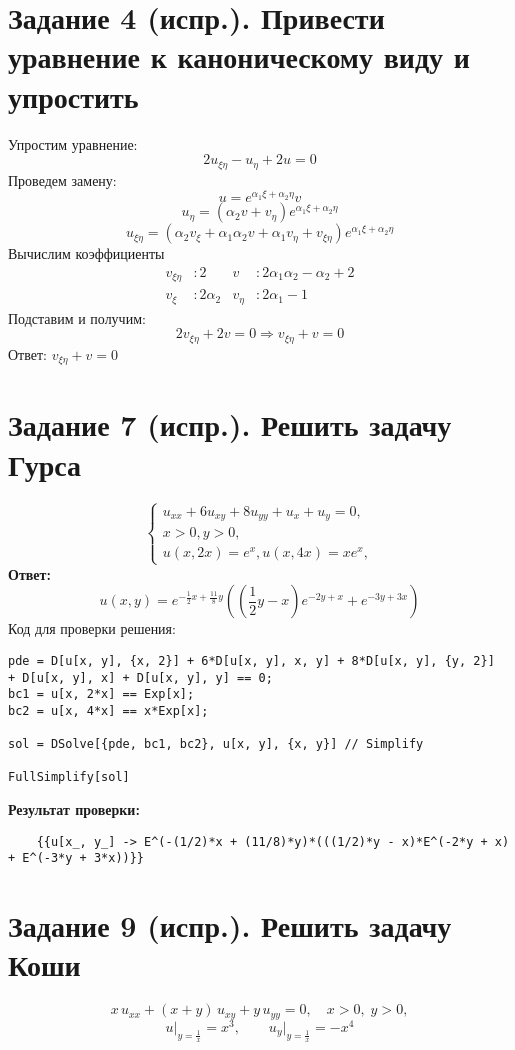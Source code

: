 \documentclass[a4paper,12pt]{article}
\begin{document}
\section*{Задание 4 (испр.). Привести уравнение к каноническому виду и упростить}
Упростим уравнение:
$$2u_{\xi\eta} - u_\eta + 2u = 0$$
Проведем замену:
$$u = e^{\alpha_1\xi + \alpha_2\eta}v$$
$$u_\eta = (\alpha_2 v + v_\eta)e^{\alpha_1\xi + \alpha_2\eta}$$
$$u_{\xi\eta} = (\alpha_2v_\xi + \alpha_1\alpha_2 v + \alpha_1 v_\eta + v_{\xi\eta})e^{\alpha_1\xi + \alpha_2\eta}$$
Вычислим коэффициенты
\begin{align*}
    v_{\xi\eta} &: 2  &v &: 2\alpha_1\alpha_2 - \alpha_2 + 2 \\
    v_\xi &: 2\alpha_2 &v_\eta &: 2\alpha_1 - 1
\end{align*}
Подставим и получим:
$$2v_{\xi\eta} + 2v = 0 \Rightarrow v_{\xi\eta} + v = 0$$
Ответ: $v_{\xi\eta} + v = 0$

\section*{Задание 7 (испр.). Решить задачу Гурса}
    \begin{equation*}
        \begin{cases}
            u_{xx} + 6u_{xy} + 8u_{yy} + u_x + u_y = 0,
            \\
            x > 0, y>0,
            \\
            u(x,2x) = e^x, u(x, 4x) = xe^x,
        \end{cases}
    \end{equation*}
\textbf{Ответ:}
$$u(x,y) = e^{-\frac{1}{2}x + \frac{11}{8}y}((\frac{1}{2}y - x)e^{-2y+x} + e^{-3y+3x})$$
Код для проверки решения:
\begin{lstlisting}
pde = D[u[x, y], {x, 2}] + 6*D[u[x, y], x, y] + 8*D[u[x, y], {y, 2}] 
+ D[u[x, y], x] + D[u[x, y], y] == 0;
bc1 = u[x, 2*x] == Exp[x];
bc2 = u[x, 4*x] == x*Exp[x];

sol = DSolve[{pde, bc1, bc2}, u[x, y], {x, y}] // Simplify

FullSimplify[sol]
\end{lstlisting}
\textbf{Результат проверки:}
\begin{lstlisting}
    {{u[x_, y_] -> E^(-(1/2)*x + (11/8)*y)*(((1/2)*y - x)*E^(-2*y + x) + E^(-3*y + 3*x))}}
\end{lstlisting}

\section*{Задание 9 (испр.). Решить задачу Коши}
        \begin{equation*}
            x\,u_{xx} + (x+y)\,u_{xy} + y\,u_{yy}=0,\quad x>0,\;y>0,
        \end{equation*}
        \[
        u \Big|_{y=\frac{1}{x}} = x^3, \quad \quad  u_{y} \Big|_{y=\frac{1}{x}} = -x^4
        \]
\end{document}
